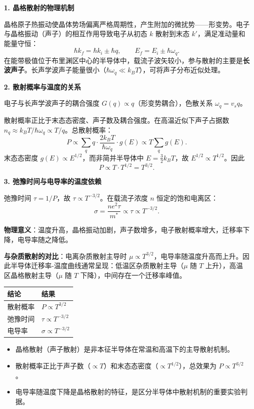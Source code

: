 \begin{derivationbox}[标准解题过程]
\textbf{1. 晶格散射的物理机制}

晶格原子热振动使晶体势场偏离严格周期性，产生附加的微扰势——形变势。电子与晶格振动（声子）的相互作用导致电子从初态 $k$ 散射到末态 $k'$，满足准动量和能量守恒：
\[
\hbar k_f=\hbar k_i\pm\hbar q,\qquad E_f=E_i\pm\hbar\omega_q.
\]
在能带极值位于布里渊区中心的半导体中，载流子波矢较小，参与散射的主要是\textbf{长波声子}。长声学波声子能量很小（$\hbar\omega_q\ll k_BT$），可将声子分布近似处理。

\textbf{2. 散射概率与温度的关系}

电子与长声学波声子的耦合强度 $G(q)\propto q$（形变势耦合），色散关系 $\omega_q=v_sq$。

散射概率正比于末态态密度、声子数及耦合强度。在高温近似下声子占据数 $n_q\approx k_BT/\hbar\omega_q\propto T/q$。总散射概率：
\[
P\propto\sum_q q\cdot\frac{2k_BT}{\hbar\omega_q}\cdot g(E)\propto T\sum_q g(E).
\]
末态态密度 $g(E)\propto E^{1/2}$，而非简并半导体中 $E=\frac{3}{2}k_BT$，故 $E^{1/2}\propto T^{1/2}$。因此
\[
P\propto T\cdot T^{1/2}=T^{3/2}.
\]

\textbf{3. 弛豫时间与电导率的温度依赖}

弛豫时间 $\tau=1/P$，故 $\tau\propto T^{-3/2}$。在载流子浓度 $n$ 恒定的饱和电离区：
\begin{equation}
\boxed{\sigma=\frac{ne^2\tau}{m^*}\propto\tau\propto T^{-3/2}.}
\end{equation}

\textbf{物理意义}：温度升高，晶格振动加剧，声子数增多，电子散射概率增大，迁移率下降，电导率随之降低。

\textbf{与杂质散射的对比}：电离杂质散射主导时 $\mu\propto T^{3/2}$，电导率随温度升高而上升。因此半导体迁移率-温度曲线通常呈现：低温区杂质散射主导（$\mu$ 随 $T$ 上升），高温区晶格散射主导（$\mu$ 随 $T$ 下降），中间存在一个迁移率峰值。
\end{derivationbox}

\begin{formulabox}[答案汇总]
\begin{center}
\begin{tabular}{ll}
\toprule
\textbf{结论} & \textbf{结果} \\
\midrule
散射概率 & $P\propto T^{3/2}$ \\
弛豫时间 & $\tau\propto T^{-3/2}$ \\
电导率 & $\sigma\propto T^{-3/2}$ \\
\bottomrule
\end{tabular}
\end{center}
\end{formulabox}

\begin{insightbox}[物理图像]
\begin{itemize}
    \item 晶格散射（声子散射）是非本征半导体在常温和高温下的主导散射机制。
    \item 散射概率正比于声子数（$\propto T$）和末态态密度（$\propto T^{1/2}$），总效果为 $P\propto T^{3/2}$。
    \item 电导率随温度下降是晶格散射的特征，是区分半导体中散射机制的重要实验判据。
\end{itemize}
\end{insightbox}
